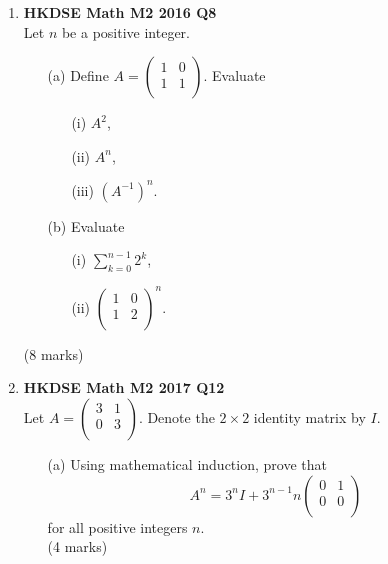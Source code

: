 \documentclass{report}
\begin{document}
\begin{enumerate}
	\item \textbf{HKDSE Math M2 2016 Q8}\\
	Let $n$ be a positive integer.
	\begin{enumerate}
		\item [(a)]Define $A = 
		\begin{pmatrix}
			1&0\\1&1\\
		\end{pmatrix}$. Evaluate 
		\begin{enumerate}
			\item [(i)]$A^2$, 
			\item [(ii)]$A^n$,
			\item [(iii)]$(A^{-1})^n$.
		\end{enumerate}
		\item [(b)]Evaluate
		\begin{enumerate}
			\item [(i)]$\displaystyle\sum_{k=0}^{n-1} 2^k$,
			\item [(ii)]$\begin{pmatrix}
				1&0\\1&2\\
			\end{pmatrix} ^n$.
		\end{enumerate}
	\end{enumerate}
	(8 marks)
	
	\newpage

	\item \textbf{HKDSE Math M2 2017 Q12}\\
	Let $A = \begin{pmatrix}
		3 & 1\\
		0 & 3\\
	\end{pmatrix}$. Denote the $2 \times 2$ identity matrix by $I$.
	\begin{enumerate}
		\item [(a)]Using mathematical induction, prove that $$A^n = 3^nI + 3^{n-1}n\begin{pmatrix}
			0&1\\0&0\\
			\end{pmatrix}$$ for all positive integers $n$. \\(4 marks)


\end{enumerate}
\end{enumerate}
\end{document}
